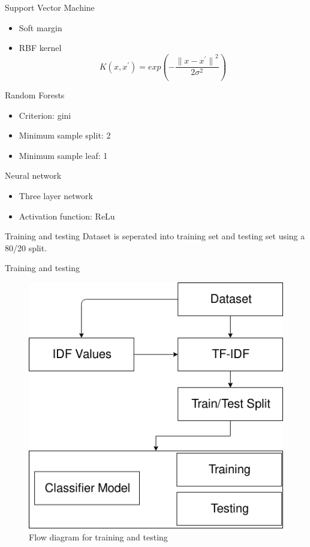 \documentclass[12pt]{beamer}
\begin{document}
\begin{frame}{Support Vector Machine}
    \begin{itemize}
        \item Soft margin
        \item RBF kernel
        \begin{equation}
            \label{eq:rbf_kernel}
            K(x, x^{'}) = exp(- \frac{{\lVert x - x^{'} \rVert}^{2}}{2 \sigma^{2}})
        \end{equation}
    \end{itemize}
\end{frame}

\begin{frame}{Random Forests}
    \begin{itemize}
        \item Criterion: gini
        \item Minimum sample split: 2
        \item Minimum sample leaf: 1
    \end{itemize}
\end{frame}

\begin{frame}{Neural network}
    \begin{itemize}
        \item Three layer network
        \item Activation function: ReLu
    \end{itemize}
\end{frame}

\begin{frame}{Training and testing}
    Dataset is seperated into training set and testing set using a 80/20 split.
\end{frame}

\begin{frame}{Training and testing}
    \begin{figure}[h]
        \includegraphics[scale=0.4]{images/training.png}
        \caption{Flow diagram for training and testing}
        \label{fig:training_testing}
    \end{figure}
\end{frame}
\end{document}
